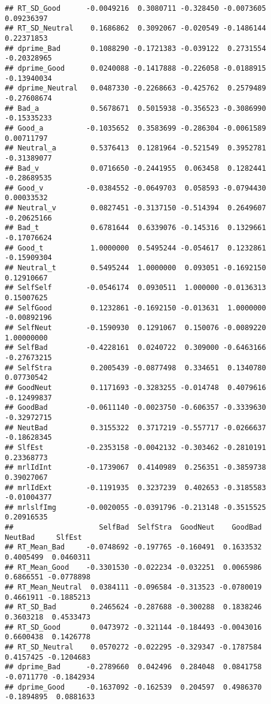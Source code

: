 \documentclass[man]{apa6}
\begin{document}
\begin{verbatim}
## RT_SD_Good      -0.0049216  0.3080711 -0.328450 -0.0073605  0.09236397
## RT_SD_Neutral    0.1686862  0.3092067 -0.020549 -0.1486144  0.22371853
## dprime_Bad       0.1088290 -0.1721383 -0.039122  0.2731554 -0.20328965
## dprime_Good      0.0240088 -0.1417888 -0.226058 -0.0188915 -0.13940034
## dprime_Neutral   0.0487330 -0.2268663 -0.425762  0.2579489 -0.27608674
## Bad_a            0.5678671  0.5015938 -0.356523 -0.3086990 -0.15335233
## Good_a          -0.1035652  0.3583699 -0.286304 -0.0061589  0.00711797
## Neutral_a        0.5376413  0.1281964 -0.521549  0.3952781 -0.31389077
## Bad_v            0.0716650 -0.2441955  0.063458  0.1282441 -0.28689535
## Good_v          -0.0384552 -0.0649703  0.058593 -0.0794430  0.00033532
## Neutral_v        0.0827451 -0.3137150 -0.514394  0.2649607 -0.20625166
## Bad_t            0.6781644  0.6339076 -0.145316  0.1329661 -0.17076624
## Good_t           1.0000000  0.5495244 -0.054617  0.1232861 -0.15909304
## Neutral_t        0.5495244  1.0000000  0.093051 -0.1692150  0.12910667
## SelfSelf        -0.0546174  0.0930511  1.000000 -0.0136313  0.15007625
## SelfGood         0.1232861 -0.1692150 -0.013631  1.0000000 -0.00892196
## SelfNeut        -0.1590930  0.1291067  0.150076 -0.0089220  1.00000000
## SelfBad         -0.4228161  0.0240722  0.309000 -0.6463166 -0.27673215
## SelfStra         0.2005439 -0.0877498  0.334651  0.1340780  0.07730542
## GoodNeut         0.1171693 -0.3283255 -0.014748  0.4079616 -0.12499837
## GoodBad         -0.0611140 -0.0023750 -0.606357 -0.3339630 -0.32972715
## NeutBad          0.3155322  0.3717219 -0.557717 -0.0266637 -0.18628345
## SlfEst          -0.2353158 -0.0042132 -0.303462 -0.2810191  0.23368773
## mrlIdInt        -0.1739067  0.4140989  0.256351 -0.3859738  0.39027067
## mrlIdExt        -0.1191935  0.3237239  0.402653 -0.3185583 -0.01004377
## mrlslfImg       -0.0020055 -0.0391796 -0.213148 -0.3515525  0.20916535
##                    SelfBad  SelfStra  GoodNeut    GoodBad    NeutBad     SlfEst
## RT_Mean_Bad     -0.0748692 -0.197765 -0.160491  0.1633532  0.4005499  0.0460311
## RT_Mean_Good    -0.3301530 -0.022234 -0.032251  0.0065986  0.6866551 -0.0778898
## RT_Mean_Neutral  0.0384111 -0.096584 -0.313523 -0.0780019  0.4661911 -0.1885213
## RT_SD_Bad        0.2465624 -0.287688 -0.300288  0.1838246  0.3603218  0.4533473
## RT_SD_Good       0.0473972 -0.321144 -0.184493 -0.0043016  0.6600438  0.1426778
## RT_SD_Neutral    0.0570272 -0.022295 -0.329347 -0.1787584  0.4157425 -0.1204683
## dprime_Bad      -0.2789660  0.042496  0.284048  0.0841758 -0.0711770 -0.1842934
## dprime_Good     -0.1637092 -0.162539  0.204597  0.4986370 -0.1894895  0.0881633

\end{verbatim}
\end{document}
